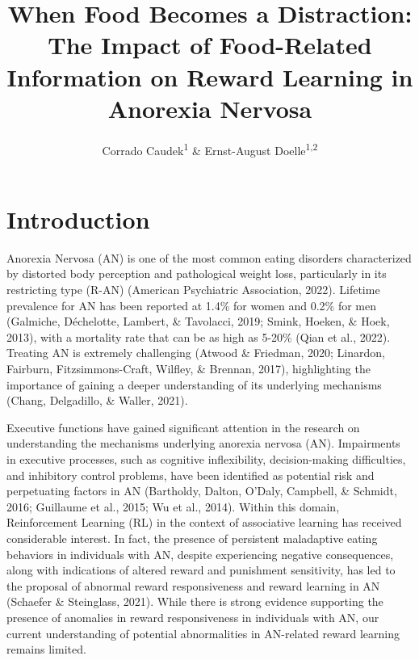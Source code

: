 \documentclass[
  man,floatsintext]{apa6}
\title{When Food Becomes a Distraction: The Impact of Food-Related Information on Reward Learning in Anorexia Nervosa}
\author{Corrado Caudek\textsuperscript{1} \& Ernst-August Doelle\textsuperscript{1,2}}
\date{}
\affiliation{\vspace{0.5cm}\textsuperscript{1} Wilhelm-Wundt-University\\\textsuperscript{2} Konstanz Business School}
\begin{document}
\maketitle

\hypertarget{introduction}{%
\section{Introduction}\label{introduction}}

Anorexia Nervosa (AN) is one of the most common eating disorders characterized by distorted body perception and pathological weight loss, particularly in its restricting type (R-AN) (American Psychiatric Association, 2022). Lifetime prevalence for AN has been reported at 1.4\% for women and 0.2\% for men (Galmiche, Déchelotte, Lambert, \& Tavolacci, 2019; Smink, Hoeken, \& Hoek, 2013), with a mortality rate that can be as high as 5-20\% (Qian et al., 2022). Treating AN is extremely challenging (Atwood \& Friedman, 2020; Linardon, Fairburn, Fitzsimmons-Craft, Wilfley, \& Brennan, 2017), highlighting the importance of gaining a deeper understanding of its underlying mechanisms (Chang, Delgadillo, \& Waller, 2021).

Executive functions have gained significant attention in the research on understanding the mechanisms underlying anorexia nervosa (AN). Impairments in executive processes, such as cognitive inflexibility, decision-making difficulties, and inhibitory control problems, have been identified as potential risk and perpetuating factors in AN (Bartholdy, Dalton, O'Daly, Campbell, \& Schmidt, 2016; Guillaume et al., 2015; Wu et al., 2014). Within this domain, Reinforcement Learning (RL) in the context of associative learning has received considerable interest. In fact, the presence of persistent maladaptive eating behaviors in individuals with AN, despite experiencing negative consequences, along with indications of altered reward and punishment sensitivity, has led to the proposal of abnormal reward responsiveness and reward learning in AN (Schaefer \& Steinglass, 2021). While there is strong evidence supporting the presence of anomalies in reward responsiveness in individuals with AN, our current understanding of potential abnormalities in AN-related reward learning remains limited.
\end{document}
